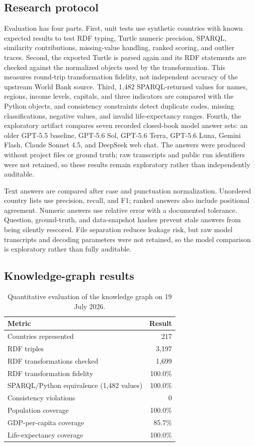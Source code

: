 \documentclass[12pt,a4paper]{article}
\begin{document}
\subsection{Research protocol}
Evaluation has four parts. First, unit tests use synthetic countries with known expected results to test RDF typing, Turtle numeric precision, SPARQL, similarity contributions, missing-value handling, ranked scoring, and outlier traces. Second, the exported Turtle is parsed again and its RDF statements are checked against the normalized objects used by the transformation. This measures round-trip transformation fidelity, not independent accuracy of the upstream World Bank source. Third, 1,482 SPARQL-returned values for names, regions, income levels, capitals, and three indicators are compared with the Python objects, and consistency constraints detect duplicate codes, missing classifications, negative values, and invalid life-expectancy ranges. Fourth, the exploratory artifact compares seven recorded closed-book model answer sets: an older GPT-5.5 baseline, GPT-5.6 Sol, GPT-5.6 Terra, GPT-5.6 Luna, Gemini Flash, Claude Sonnet 4.5, and DeepSeek web chat. The answers were produced without project files or ground truth; raw transcripts and public run identifiers were not retained, so these results remain exploratory rather than independently auditable.

Text answers are compared after case and punctuation normalization. Unordered country lists use precision, recall, and F1; ranked answers also include positional agreement. Numeric answers use relative error with a documented tolerance. Question, ground-truth, and data-snapshot hashes prevent stale answers from being silently rescored. File separation reduces leakage risk, but raw model transcripts and decoding parameters were not retained, so the model comparison is exploratory rather than fully auditable.

\subsection{Knowledge-graph results}
\begin{table}[ht]
\centering
\small
\begin{tabular}{lr}
\toprule
Metric & Result \\
\midrule
Countries represented & 217 \\
RDF triples & 3,197 \\
RDF transformations checked & 1,699 \\
RDF transformation fidelity & 100.0\% \\
SPARQL/Python equivalence (1,482 values) & 100.0\% \\
Consistency violations & 0 \\
Population coverage & 100.0\% \\
GDP-per-capita coverage & 85.7\% \\
Life-expectancy coverage & 100.0\% \\
\bottomrule
\end{tabular}
\caption{Quantitative evaluation of the knowledge graph on 19 July 2026.}
\label{tab:kg-results}
\end{table}
\end{document}
